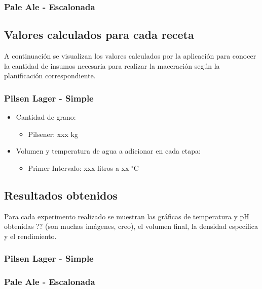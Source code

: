             \subsubsection{Pale Ale - Escalonada}
            
    \subsection{Valores calculados para cada receta}
    \par A continuación se visualizan los valores calculados por la aplicación para conocer la cantidad de insumos necesaria para realizar la maceración según la planificación correspondiente.
        \subsubsection{Pilsen Lager - Simple}
            \begin{itemize}
                \item Cantidad de grano:
                    \begin{itemize}
                        \item Pilsener: xxx kg
                    \end{itemize}
                \item Volumen y temperatura de agua a adicionar en cada etapa:
                    \begin{itemize}
                        \item Primer Intervalo: xxx litros a xx $^{\circ}$C
                    \end{itemize}
            \end{itemize}
    
    \subsection{Resultados obtenidos}
        \par Para cada experimento realizado se muestran las gráficas de temperatura y pH obtenidas ?? (son muchas imágenes, creo), el volumen final, la densidad especifica y el rendimiento.
        
        \subsubsection{Pilsen Lager - Simple}
        
        \subsubsection{Pale Ale - Escalonada}
        
        
        
